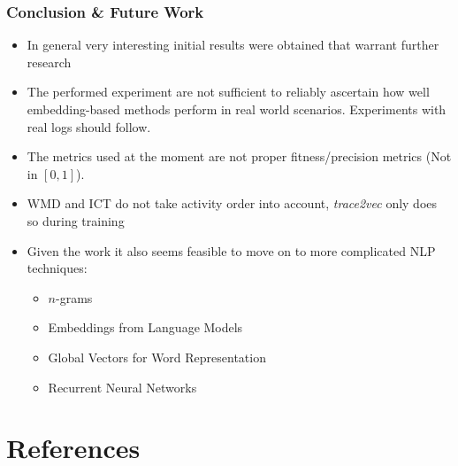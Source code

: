 \documentclass{beamer}
\begin{document}
\begin{frame}
	\frametitle{Conclusion \& Future Work}
	\begin{itemize}
		\item In general very interesting initial results were obtained that warrant further research
		\item The performed experiment are not sufficient to reliably ascertain how well embedding-based methods perform in real world scenarios. Experiments with real logs should follow.
		\item The metrics used at the moment are not proper fitness/precision metrics (Not in $[0,1]$).
		\item WMD and ICT do not take activity order into account, \emph{trace2vec} only does so during training
		\item Given the work it also seems feasible to move on to more complicated NLP techniques:
		\begin{itemize}
			\item $n$-grams
			\item Embeddings from Language Models
			\item Global Vectors for Word Representation
			\item Recurrent Neural Networks
		\end{itemize}
	\end{itemize}
\end{frame}

\section*{References}
\begin{frame}[allowframebreaks]
	
	
\end{frame}
	
\end{document}
